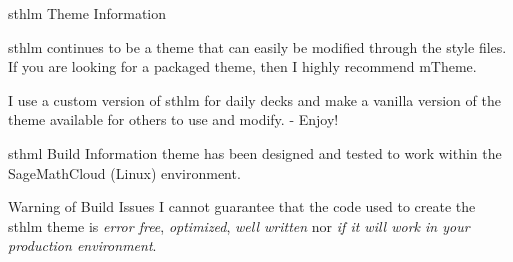 \documentclass[newPxFont]{beamer}
\begin{document}

\begin{frame}[c]{sthlm Theme Information}
	
\alert{sthlm} continues to be a theme that can easily be modified through the style files.  If you are looking for a packaged theme, then I highly recommend \alert{mTheme}.\\

\vspace{1em}

I use a custom version of \alert{sthlm} for daily decks and make a vanilla version of the theme available for others to use and modify. - Enjoy!

\end{frame}


\begin{frame}[c]{sthml Build Information}
 theme has been designed and tested to work within the SageMathCloud (Linux) environment.\\

\vspace{1em}

\begin{alertblock}{Warning of Build Issues}
I cannot guarantee that the code used to create the sthlm theme is \emph{error free}, \emph{optimized}, \emph{well written} nor \emph{if it will work in your production environment}.
\end{alertblock}


\end{frame}

\end{document}
